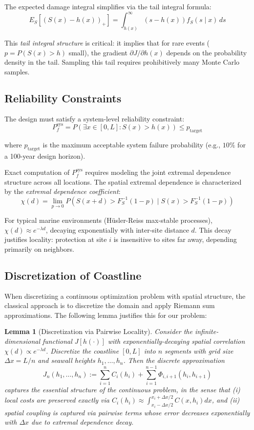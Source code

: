 \documentclass[12pt]{article}
\newtheorem{lemma}{Lemma}[section]
\theoremstyle{definition}
\begin{document}
The expected damage integral simplifies via the tail integral formula:
\[
E_S[(S(x)-h(x))_+] = \int_{h(x)}^\infty (s-h(x)) f_S(s\mid x) \, ds
\]

This \emph{tail integral structure} is critical: it implies that for rare events ($p = P(S(x)>h)$ small), the gradient $\partial J/\partial h(x)$ depends on the probability density in the tail. Sampling this tail requires prohibitively many Monte Carlo samples.

\subsection{Reliability Constraints}

The design must satisfy a system-level reliability constraint:
\[
P_f^{\text{sys}} = P\left(\exists x \in [0,L]: S(x) > h(x)\right) \leq p_{\text{target}}
\]

where $p_{\text{target}}$ is the maximum acceptable system failure probability (e.g., $10\%$ for a 100-year design horizon).

Exact computation of $P_f^{\text{sys}}$ requires modeling the joint extremal dependence structure across all locations. The spatial extremal dependence is characterized by the \emph{extremal dependence coefficient}:
\[
\chi(d) = \lim_{p\to 0} P(S(x+d) > F_S^{-1}(1-p) \mid S(x) > F_S^{-1}(1-p))
\]

For typical marine environments (Hüsler-Reiss max-stable processes), $\chi(d) \approx e^{-\lambda d}$, decaying exponentially with inter-site distance $d$. This decay justifies locality: protection at site $i$ is insensitive to sites far away, depending primarily on neighbors.

\subsection{Discretization of Coastline}

When discretizing a continuous optimization problem with spatial structure, the classical approach is to discretize the domain and apply Riemann sum approximations. The following lemma justifies this for our problem:

\begin{lemma}[Discretization via Pairwise Locality]
Consider the infinite-dimensional functional $J[h(\cdot)]$ with exponentially-decaying spatial correlation $\chi(d) \propto e^{-\lambda d}$. Discretize the coastline $[0,L]$ into $n$ segments with grid size $\Delta x = L/n$ and seawall heights $h_1,\ldots,h_n$. Then the discrete approximation
\[
J_n(h_1,\ldots,h_n) := \sum_{i=1}^n C_i(h_i) + \sum_{i=1}^{n-1} \Phi_{i,i+1}(h_i, h_{i+1})
\]
captures the essential structure of the continuous problem, in the sense that (i) local costs are preserved exactly via $C_i(h_i) \approx \int_{x_i-\Delta x/2}^{x_i+\Delta x/2} C(x,h_i) dx$, and (ii) spatial coupling is captured via pairwise terms whose error decreases exponentially with $\Delta x$ due to extremal dependence decay.
\end{lemma}
\end{document}
